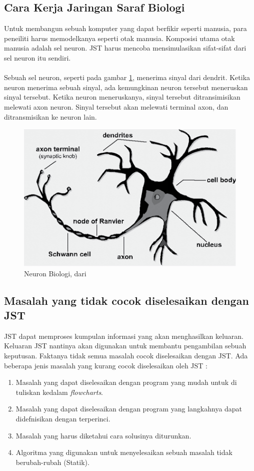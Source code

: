 \subsection{Cara Kerja Jaringan Saraf Biologi}
Untuk membangun sebuah komputer yang dapat berfikir seperti manusia, para
peneiliti harus memodelkanya seperti otak manusia. Komposisi utama otak
manusia adalah sel neuron. JST harus mencoba mensimulasikan sifat-sifat dari
sel neuron itu sendiri.\\\\
Sebuah sel neuron, seperti pada gambar \ref{fig:neuron_biologi}, menerima sinyal dari dendrit. Ketika neuron menerima sebuah sinyal, ada kemungkinan neuron tersebut meneruskan sinyal tersebut. Ketika neuron meneruskanya, sinyal tersebut ditransimisikan melewati axon neuron. Sinyal tersebut akan melewati terminal axon, dan ditransmisikan ke neuron lain.
\begin{figure}
\centering
\includegraphics[width=0.7\linewidth]{Gambar/mine/neuron}
\caption[Neuron Biologi, dari \cite{IntroNNforJava:2015}]{Neuron Biologi, dari \cite{IntroNNforJava:2015}} 
\label{fig:neuron_biologi}
\end{figure}
\subsection{Masalah yang tidak cocok diselesaikan dengan JST}
JST dapat memproses kumpulan informasi yang akan menghasilkan keluaran. Keluaran JST nantinya akan digunakan untuk membantu pengambilan sebuah keputusan. Faktanya tidak semua masalah cocok diselesaikan dengan JST. Ada beberapa jenis masalah yang kurang cocok diselesaikan oleh JST :
\begin{enumerate}
	\item Masalah yang dapat diselesaikan dengan program yang mudah untuk di tuliskan kedalam \textit{flowcharts}.
	\item Masalah yang dapat diselesaikan dengan program yang langkahnya dapat didefnisikan dengan terperinci.
	\item Masalah yang harus diketahui cara solusinya diturunkan.
	\item Algoritma yang digunakan untuk menyelesaikan sebuah masalah tidak berubah-rubah (Statik).
\end{enumerate}
